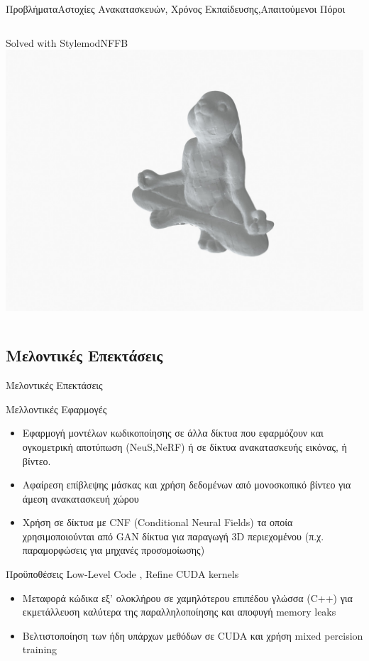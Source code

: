\documentclass[10pt]{beamer}
\begin{document}
\begin{frame}{Προβλήματα}{Αστοχίες Ανακατασκευών, Χρόνος Εκπαίδευσης,Απαιτούμενοι Πόροι }
\begin{columns}
    \tiny{Solved with StylemodNFFB}
    \includegraphics[height=.25\textheight]{images/110.jpg} \\
\end{columns}

    
\end{frame}
\subsection{Μελοντικές Επεκτάσεις}
\begin{frame}{Μελοντικές Επεκτάσεις}
\begin{block}{Μελλοντικές Εφαρμογές}
\begin{itemize}
    \item Εφαρμογή μοντέλων κωδικοποίησης σε άλλα δίκτυα που εφαρμόζουν και ογκομετρική αποτύπωση (NeuS,NeRF) ή σε δίκτυα ανακατασκευής εικόνας, ή βίντεο.
    \item Αφαίρεση επίβλεψης μάσκας και χρήση δεδομένων από μονοσκοπικό βίντεο για άμεση ανακατασκευή χώρου
    \item Χρήση σε δίκτυα με CNF (Conditional Neural Fields) τα οποία χρησιμοποιούνται από GAN δίκτυα για παραγωγή 3D περιεχομένου (π.χ. παραμορφώσεις για μηχανές προσομοίωσης)
\end{itemize}
\end{block}

\begin{block}{\small{Προϋποθέσεις Low-Level Code , Refine CUDA kernels}}
    \tiny{
    \begin{itemize}
        \item Μεταφορά κώδικα εξ' ολοκλήρου σε χαμηλότερου επιπέδου γλώσσα (C++) για εκμετάλλευση καλύτερα της παραλληλοποίησης και αποφυγή memory leaks
        \item  Βελτιστοποίηση των ήδη υπάρχων μεθόδων σε CUDA και χρήση mixed percision training
    \end{itemize}}
    
\end{block}


\end{frame}
\end{document}
